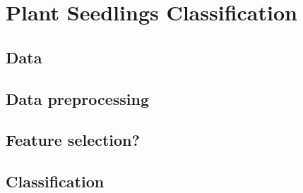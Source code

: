\section{Plant Seedlings Classification}
\subsection{Data}
\subsection{Data preprocessing}
\subsection{Feature selection?}
\subsection{Classification}
